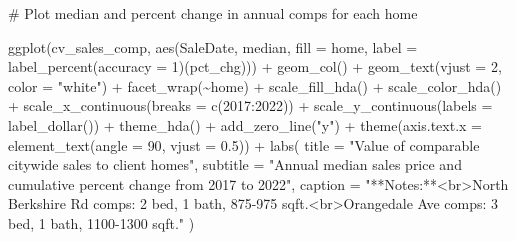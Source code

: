 \documentclass[
  letterpaper,
  DIV=11,
  numbers=noendperiod]{scrartcl}
\newenvironment{Shaded}{\begin{snugshade}}{\end{snugshade}}
\newcommand{\AttributeTok}[1]{\textcolor[rgb]{0.40,0.45,0.13}{#1}}
\newcommand{\CommentTok}[1]{\textcolor[rgb]{0.37,0.37,0.37}{#1}}
\newcommand{\DecValTok}[1]{\textcolor[rgb]{0.68,0.00,0.00}{#1}}
\newcommand{\FloatTok}[1]{\textcolor[rgb]{0.68,0.00,0.00}{#1}}
\newcommand{\FunctionTok}[1]{\textcolor[rgb]{0.28,0.35,0.67}{#1}}
\newcommand{\NormalTok}[1]{\textcolor[rgb]{0.00,0.23,0.31}{#1}}
\newcommand{\SpecialCharTok}[1]{\textcolor[rgb]{0.37,0.37,0.37}{#1}}
\newcommand{\StringTok}[1]{\textcolor[rgb]{0.13,0.47,0.30}{#1}}
\begin{document}
\begin{Shaded}
\begin{Highlighting}[]
\CommentTok{\# Plot median and percent change in annual comps for each home}

\FunctionTok{ggplot}\NormalTok{(cv\_sales\_comp,}
       \FunctionTok{aes}\NormalTok{(SaleDate,}
\NormalTok{           median,}
           \AttributeTok{fill =}\NormalTok{ home,}
           \AttributeTok{label =} \FunctionTok{label\_percent}\NormalTok{(}\AttributeTok{accuracy =} \DecValTok{1}\NormalTok{)(pct\_chg))) }\SpecialCharTok{+}
  \FunctionTok{geom\_col}\NormalTok{() }\SpecialCharTok{+}
  \FunctionTok{geom\_text}\NormalTok{(}\AttributeTok{vjust =} \DecValTok{2}\NormalTok{,}
            \AttributeTok{color =} \StringTok{"white"}\NormalTok{) }\SpecialCharTok{+}
  \FunctionTok{facet\_wrap}\NormalTok{(}\SpecialCharTok{\textasciitilde{}}\NormalTok{home) }\SpecialCharTok{+}
  \FunctionTok{scale\_fill\_hda}\NormalTok{() }\SpecialCharTok{+}
  \FunctionTok{scale\_color\_hda}\NormalTok{() }\SpecialCharTok{+}
  \FunctionTok{scale\_x\_continuous}\NormalTok{(}\AttributeTok{breaks =} \FunctionTok{c}\NormalTok{(}\DecValTok{2017}\SpecialCharTok{:}\DecValTok{2022}\NormalTok{)) }\SpecialCharTok{+}
  \FunctionTok{scale\_y\_continuous}\NormalTok{(}\AttributeTok{labels =} \FunctionTok{label\_dollar}\NormalTok{()) }\SpecialCharTok{+}
  \FunctionTok{theme\_hda}\NormalTok{() }\SpecialCharTok{+}
  \FunctionTok{add\_zero\_line}\NormalTok{(}\StringTok{"y"}\NormalTok{) }\SpecialCharTok{+}
  \FunctionTok{theme}\NormalTok{(}\AttributeTok{axis.text.x =} \FunctionTok{element\_text}\NormalTok{(}\AttributeTok{angle =} \DecValTok{90}\NormalTok{, }\AttributeTok{vjust =} \FloatTok{0.5}\NormalTok{)) }\SpecialCharTok{+}
  \FunctionTok{labs}\NormalTok{(}
    \AttributeTok{title =} \StringTok{"Value of comparable citywide sales to client homes"}\NormalTok{,}
    \AttributeTok{subtitle =} \StringTok{"Annual median sales price and cumulative percent change from 2017 to 2022"}\NormalTok{,}
    \AttributeTok{caption =} \StringTok{"**Notes:**\textless{}br\textgreater{}North Berkshire Rd comps: 2 bed, 1 bath, 875{-}975 sqft.\textless{}br\textgreater{}Orangedale Ave comps: 3 bed, 1 bath, 1100{-}1300 sqft."}
\NormalTok{  )}
\end{Highlighting}
\end{Shaded}
\end{document}
